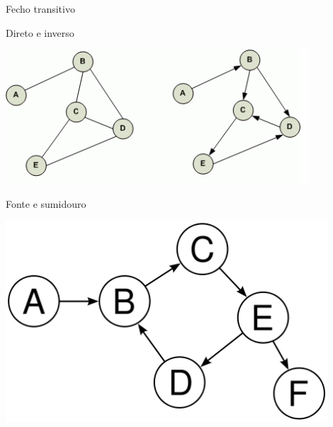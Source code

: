 \documentclass[compress,mathserif]{beamer}
\begin{document}
\begin{frame}{Fecho transitivo}

Direto e inverso

\vspace{1cm}

\centering \includegraphics[width=\textwidth]{images/caminhos.png}

\end{frame}


\begin{frame}{Fonte e sumidouro}

\vspace{1cm}

\centering \includegraphics[width=0.9\textwidth]{images/ciclo.png}

\end{frame}

\end{document}
